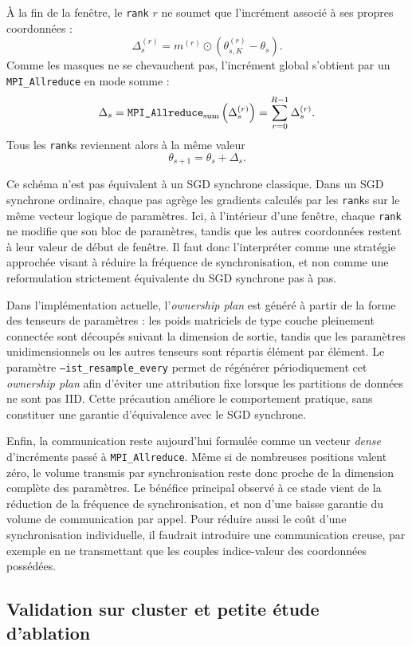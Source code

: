 \documentclass[a4paper,11pt,oneside]{article}
\begin{document}
À la fin de la fenêtre, le \texttt{rank} \(r\) ne soumet que l'incrément associé à ses propres coordonnées :
\[
\Delta_s^{(r)}
=
m^{(r)} \odot
\left(\theta_{s,K}^{(r)}-\theta_s\right).
\]
Comme les masques ne se chevauchent pas, l'incrément global s'obtient par un \texttt{MPI\_Allreduce} en mode somme :
\[
\Delta_s
=
\text{\texttt{MPI\_Allreduce}}_{\mathrm{sum}}
\left(\Delta_s^{(r)}\right)
=
\sum_{r=0}^{R-1}\Delta_s^{(r)}.
\]
Tous les \texttt{rank}s reviennent alors à la même valeur
\[
\theta_{s+1} = \theta_s + \Delta_s.
\]

Ce schéma n'est pas équivalent à un SGD synchrone classique. Dans un SGD synchrone ordinaire, chaque pas agrège les gradients calculés par les \texttt{rank}s sur le même vecteur logique de paramètres. Ici, à l'intérieur d'une fenêtre, chaque \texttt{rank} ne modifie que son bloc de paramètres, tandis que les autres coordonnées restent à leur valeur de début de fenêtre. Il faut donc l'interpréter comme une stratégie approchée visant à réduire la fréquence de synchronisation, et non comme une reformulation strictement équivalente du SGD synchrone pas à pas.

Dans l'implémentation actuelle, l'\textit{ownership plan} est généré à partir de la forme des tenseurs de paramètres : les poids matriciels de type couche pleinement connectée sont découpés suivant la dimension de sortie, tandis que les paramètres unidimensionnels ou les autres tenseurs sont répartis élément par élément. Le paramètre \texttt{--ist\_resample\_every} permet de régénérer périodiquement cet \textit{ownership plan} afin d'éviter une attribution fixe lorsque les partitions de données ne sont pas IID. Cette précaution améliore le comportement pratique, sans constituer une garantie d'équivalence avec le SGD synchrone.

Enfin, la communication reste aujourd'hui formulée comme un vecteur \textit{dense} d'incréments passé à \texttt{MPI\_Allreduce}. Même si de nombreuses positions valent zéro, le volume transmis par synchronisation reste donc proche de la dimension complète des paramètres. Le bénéfice principal observé à ce stade vient de la réduction de la fréquence de synchronisation, et non d'une baisse garantie du volume de communication par appel. Pour réduire aussi le coût d'une synchronisation individuelle, il faudrait introduire une communication creuse, par exemple en ne transmettant que les couples indice-valeur des coordonnées possédées.

\subsection{Validation sur cluster et petite étude d'ablation}
\end{document}
